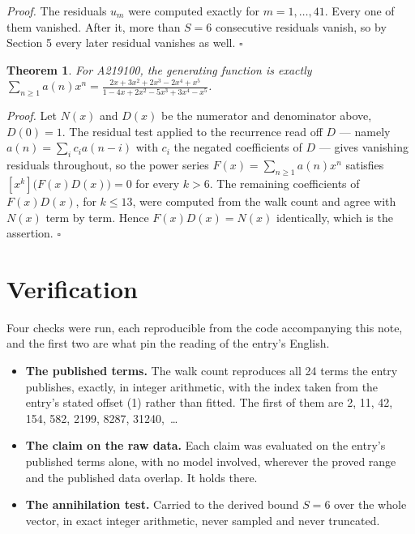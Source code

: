 \documentclass[11pt]{article}
\newtheorem{theorem}{Theorem}
\theoremstyle{definition}
\begin{document}
{\itshape Proof.} The residuals $u_m$ were computed exactly for $m = 1,\dots,41$. Every one of them vanished. After it, more than $S = 6$ consecutive residuals vanish, so by Section 5 every later residual vanishes as well. $\square$

\begin{theorem} For A219100, the generating function is exactly $\sum_{n\ge 1} a(n)x^n = \frac{2x + 3x^{2} + 2x^{3} - 2x^{4} + x^{5}}{1 - 4x + 2x^{2} - 5x^{3} + 3x^{4} - x^{5}}$.\end{theorem}

{\itshape Proof.} Let $N(x)$ and $D(x)$ be the numerator and denominator above, $D(0)=1$. The residual test applied to the recurrence read off $D$ --- namely $a(n) = \sum_i c_i a(n-i)$ with $c_i$ the negated coefficients of $D$ --- gives vanishing residuals throughout, so the power series $F(x)=\sum_{n\ge 1}a(n)x^n$ satisfies $[x^k]\bigl(F(x)D(x)\bigr) = 0$ for every $k > 6$. The remaining coefficients of $F(x)D(x)$, for $k \le 13$, were computed from the walk count and agree with $N(x)$ term by term. Hence $F(x)D(x) = N(x)$ identically, which is the assertion. $\square$

\section{Verification}

Four checks were run, each reproducible from the code accompanying this note, and the first two are what pin the reading of the entry's English.

\begin{itemize}

\item {\bfseries The published terms.} The walk count reproduces all 24 terms the entry publishes, exactly, in integer arithmetic, with the index taken from the entry's stated offset (1) rather than fitted. The first of them are 2, 11, 42, 154, 582, 2199, 8287, 31240,~\dots

\item {\bfseries The claim on the raw data.} Each claim was evaluated on the entry's published terms alone, with no model involved, wherever the proved range and the published data overlap. It holds there.

\item {\bfseries The annihilation test.} Carried to the derived bound $S = 6$ over the whole vector, in exact integer arithmetic, never sampled and never truncated.

\end{itemize}
\end{document}
